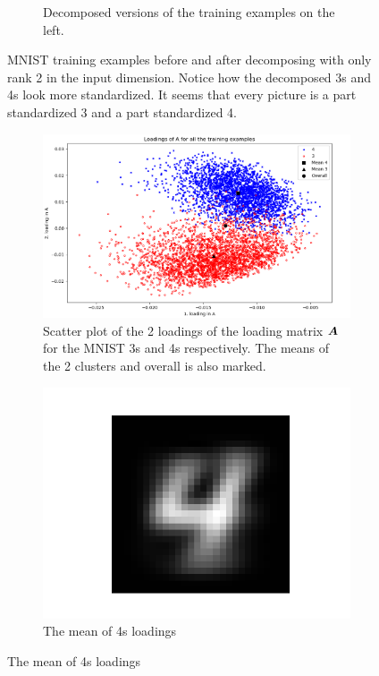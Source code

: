\begin{figure}
\begin{subfigure}{0.45\linewidth}
        \captionsetup{width=.8\linewidth}
        \caption{Decomposed versions of the training examples on the left.}
    \end{subfigure}
    \captionsetup{width=.95\linewidth}
    \caption{MNIST training examples before and after decomposing with only rank 2 in the input dimension. Notice how the decomposed 3s and 4s look more standardized. It seems that every picture is a part standardized 3 and a part standardized 4. }
    \label{fig:decompExample3_4}
\end{figure}

\begin{figure}
    \centering
    \begin{subfigure}{0.99\linewidth}
        \includegraphics[width=\linewidth]{Pics/05_methodology/LoadingsOfAScatterMNIST.png}
        \caption{Scatter plot of the 2 loadings of the loading matrix $\boldsymbol{A}$ for the MNIST 3s and 4s respectively. The means of the 2 clusters and overall is also marked.}
        \label{fig:loadingAMatrix}
    \end{subfigure}
    \begin{subfigure}{0.3\linewidth}
    \centering
        \includegraphics[width=.5\linewidth]{Pics/05_methodology/general4.png}
        \caption{The mean of 4s loadings}
    \end{subfigure}

\end{figure}
